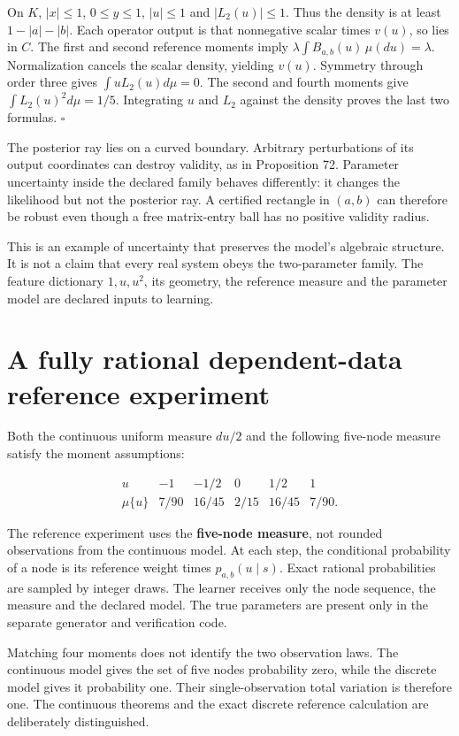 On \(K\), \(|x|\leq1\), \(0\leq y\leq1\), \(|u|\leq1\) and
\(|L_2(u)|\leq1\). Thus the density is at least \(1-|a|-|b|\). Each
operator output is that nonnegative scalar times \(v(u)\), so lies in
\(C\). The first and second reference moments imply
\(\lambda\int B_{a,b}(u)\,\mu(du)=\lambda\). Normalization cancels the
scalar density, yielding \(v(u)\). Symmetry through order three gives
\(\int uL_2(u)d\mu=0\). The second and fourth moments give
\(\int L_2(u)^2d\mu=1/5\). Integrating \(u\) and \(L_2\) against the
density proves the last two formulas. \(\square\)

The posterior ray lies on a curved boundary. Arbitrary perturbations of
its output coordinates can destroy validity, as in Proposition 72.
Parameter uncertainty inside the declared family behaves differently: it
changes the likelihood but not the posterior ray. A certified rectangle
in \((a,b)\) can therefore be robust even though a free matrix-entry
ball has no positive validity radius.

This is an example of uncertainty that preserves the model's algebraic
structure. It is not a claim that every real system obeys the
two-parameter family. The feature dictionary \(1,u,u^2\), its geometry,
the reference measure and the parameter model are declared inputs to
learning.

\section{A fully rational dependent-data reference experiment}\label{LSM:a-fully-rational-dependent-data-reference-experiment}

Both the continuous uniform measure \(du/2\) and the following five-node
measure satisfy the moment assumptions:

\[
\begin{array}{c|rrrrr}
u&-1&-1/2&0&1/2&1\\\hline
\mu\{u\}&7/90&16/45&2/15&16/45&7/90.
\end{array}
\]

The reference experiment uses the \textbf{five-node measure}, not
rounded observations from the continuous model. At each step, the
conditional probability of a node is its reference weight times
\(p_{a,b}(u\mid s)\). Exact rational probabilities are sampled by
integer draws. The learner receives only the node sequence, the measure
and the declared model. The true parameters are present only in the
separate generator and verification code.

Matching four moments does not identify the two observation laws. The
continuous model gives the set of five nodes probability zero, while the
discrete model gives it probability one. Their single-observation total
variation is therefore one. The continuous theorems and the exact
discrete reference calculation are deliberately distinguished.


